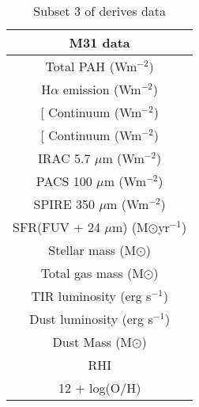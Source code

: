 \begin{table}
\centering
\caption{Subset 3 of derives data}
\label{tab: subset6}
\begin{tabular}{ |c| }
\hline
M31 data  \\
\hline\hline
Total PAH (Wm$^{-2}$)  \\
H$\alpha$ emission (Wm$^{-2}$) \\
{[}\sii{]} Continuum (Wm$^{-2}$)  \\
{[}\oiii{]} Continuum (Wm$^{-2}$)  \\
IRAC 5.7 $\mu$m (Wm$^{-2}$)\\
PACS 100 $\mu$m (Wm$^{-2}$)\\
SPIRE 350 $\mu$m (Wm$^{-2}$)\\
SFR(FUV + 24 $\mu$m) (M$\odot$yr$^{-1}$) \\
Stellar mass (M$\odot$)\\
Total gas mass (M$\odot$)  \\
TIR luminosity (erg s$^{-1}$)  \\
Dust luminosity (erg s$^{-1}$)  \\
Dust Mass (M$\odot$)\\
RHI \\
12 + log(O/H)\\
\hline
\end{tabular}
\end{table}